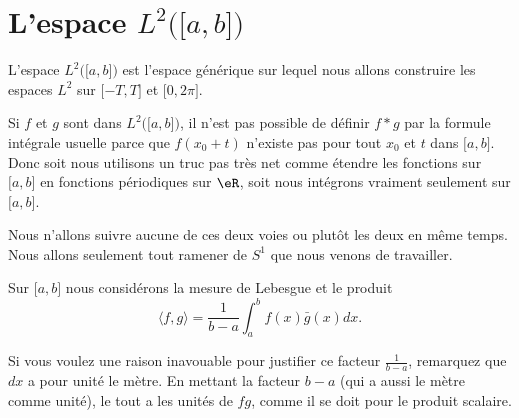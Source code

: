 \section{L'espace \( L^2\big( \mathopen[ a , b \mathclose] \big)\)}

L'espace \( L^2\big( \mathopen[ a , b \mathclose] \big)\) est l'espace générique sur lequel nous allons construire les espaces \( L^2\) sur \( \mathopen[ -T , T \mathclose]\) et \( \mathopen[ 0 , 2\pi \mathclose]\).

Si \( f\) et \( g\) sont dans \( L^2\big( \mathopen[ a , b \mathclose] \big)\), il n'est pas possible de définir \( f*g\) par la formule intégrale usuelle parce que \( f(x_0+t)\) n'existe pas pour tout \( x_0\) et \( t\) dans \( \mathopen[ a , b \mathclose]\). Donc soit nous utilisons un truc pas très net comme étendre les fonctions sur \( \mathopen[ a , b \mathclose]\) en fonctions périodiques sur \( \eR\), soit nous intégrons vraiment seulement sur \( \mathopen[ a , b \mathclose]\).

Nous n'allons suivre aucune de ces deux voies ou plutôt les deux en même temps. Nous allons seulement tout ramener de \( S^1\) que nous venons de travailler. 

\begin{definition}
    Sur \( \mathopen[ a , b \mathclose]\) nous considérons la mesure de Lebesgue et le produit
    \begin{equation}
        \langle f, g\rangle =\frac{1}{ b-a }\int_a^bf(x)\bar g(x)dx.
    \end{equation}
\end{definition}

Si vous voulez une raison inavouable pour justifier ce facteur \( \frac{1}{ b-a }\), remarquez que \( dx\) a pour unité le mètre. En mettant la facteur \( b-a\) (qui a aussi le mètre comme unité), le tout a les unités de \( fg\), comme il se doit pour le produit scalaire.

